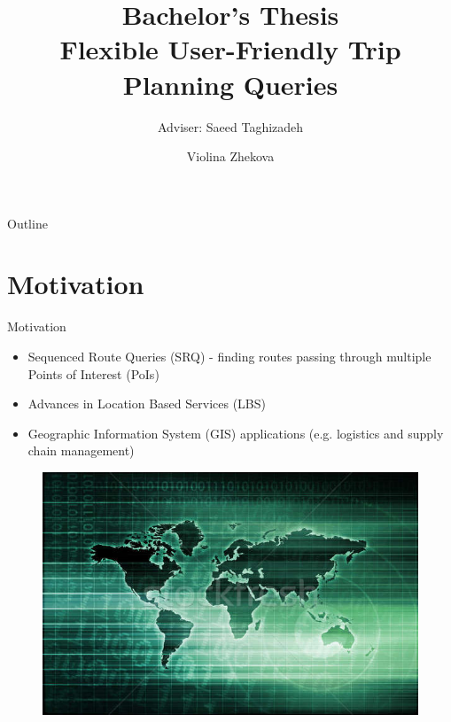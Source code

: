 \documentclass[18pt]{beamer}
\title[Flexible User-Friendly Trip Planning
Queries]{Bachelor's Thesis \\ Flexible User-Friendly Trip Planning Queries}
\subtitle{Adviser: Saeed Taghizadeh}
\author{Violina Zhekova}
\institute{IPD B{\"o}hm}
\begin{document}
	

\begin{frame}
	\titlepage
\end{frame}

\begin{frame}{Outline}
	\tableofcontents
\end{frame}


\section{Motivation}
	\begin{frame}{Motivation}
	
		\begin{itemize}
			\item Sequenced Route Queries (SRQ) - finding routes passing through multiple Points of Interest (PoIs)
			\item Advances in Location Based Services (LBS)
			\item Geographic Information System (GIS) applications (e.g. logistics and supply chain management) \newline
		\end{itemize}
		
		\begin{figure}[h]
			\includegraphics[scale=0.2]{Motivation.jpg}
		\end{figure}
	
	\end{frame}
\end{document}
